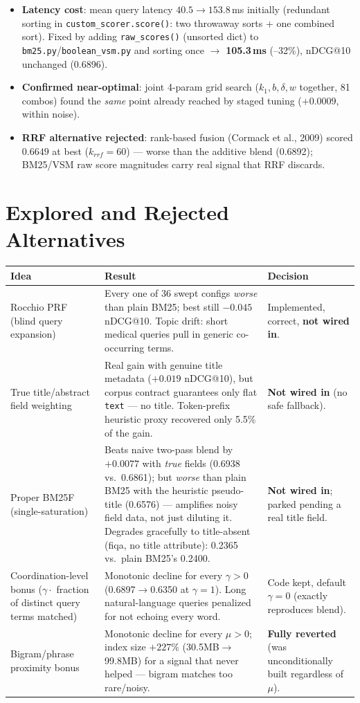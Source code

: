 \documentclass[10pt]{article}
\begin{document}
\begin{itemize}
\item \textbf{Latency cost}: mean query latency $40.5\to153.8$\,ms initially (redundant sorting in \texttt{custom\_scorer.score()}: two throwaway sorts + one combined sort). Fixed by adding \texttt{raw\_scores()} (unsorted dict) to \texttt{bm25.py}/\texttt{boolean\_vsm.py} and sorting once $\to$ \textbf{105.3\,ms} (--32\%), nDCG@10 unchanged (0.6896).
\item \textbf{Confirmed near-optimal}: joint 4-param grid search ($k_1,b,\delta,w$ together, 81 combos) found the \emph{same} point already reached by staged tuning ($+0.0009$, within noise).
\item \textbf{RRF alternative rejected}: rank-based fusion (Cormack et al., 2009) scored $0.6649$ at best ($k_{rrf}{=}60$) --- worse than the additive blend (0.6892); BM25/VSM raw score magnitudes carry real signal that RRF discards.
\end{itemize}

\section{Explored and Rejected Alternatives}
\begin{table}[h]
\centering\small
\begin{tabular}{p{2.7cm}p{6.4cm}p{4.5cm}}
\toprule
Idea & Result & Decision \\
\midrule
Rocchio PRF (blind query expansion) & Every one of 36 swept configs \emph{worse} than plain BM25; best still $-0.045$ nDCG@10. Topic drift: short medical queries pull in generic co-occurring terms. & Implemented, correct, \textbf{not wired in}. \\
True title/abstract field weighting & Real gain with genuine title metadata ($+0.019$ nDCG@10), but corpus contract guarantees only flat \texttt{text} --- no title. Token-prefix heuristic proxy recovered only 5.5\% of the gain. & \textbf{Not wired in} (no safe fallback). \\
Proper BM25F (single-saturation) & Beats naive two-pass blend by $+0.0077$ with \emph{true} fields (0.6938 vs.\ 0.6861); but \emph{worse} than plain BM25 with the heuristic pseudo-title (0.6576) --- amplifies noisy field data, not just diluting it. Degrades gracefully to title-absent (fiqa, no title attribute): 0.2365 vs.\ plain BM25's 0.2400. & \textbf{Not wired in}; parked pending a real title field. \\
Coordination-level bonus ($\gamma\cdot$ fraction of distinct query terms matched) & Monotonic decline for every $\gamma{>}0$ (0.6897$\to$0.6350 at $\gamma{=}1$). Long natural-language queries penalized for not echoing every word. & Code kept, default $\gamma{=}0$ (exactly reproduces blend). \\
Bigram/phrase proximity bonus & Monotonic decline for every $\mu{>}0$; index size $+227\%$ (30.5MB$\to$99.8MB) for a signal that never helped --- bigram matches too rare/noisy. & \textbf{Fully reverted} (was unconditionally built regardless of $\mu$). \\
\bottomrule
\end{tabular}
\end{table}
\end{document}
